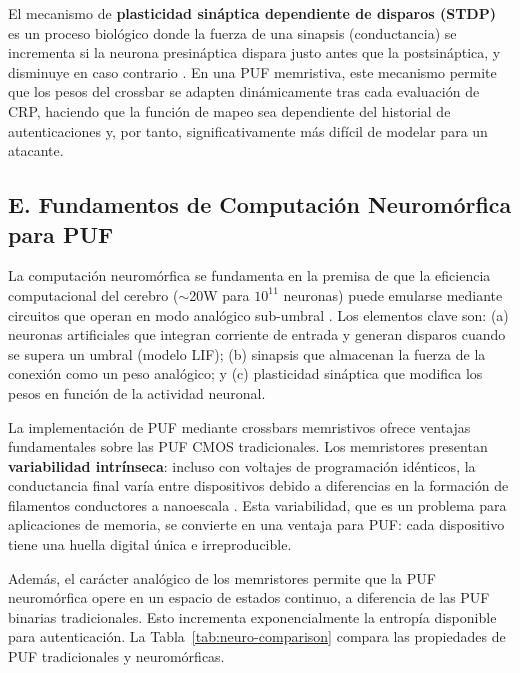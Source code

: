 El mecanismo de \textbf{plasticidad sináptica dependiente de disparos (STDP)} es un proceso biológico donde la fuerza de una sinapsis (conductancia) se incrementa si la neurona presináptica dispara justo antes que la postsináptica, y disminuye en caso contrario \cite{bi1998stdp}. En una PUF memristiva, este mecanismo permite que los pesos del crossbar se adapten dinámicamente tras cada evaluación de CRP, haciendo que la función de mapeo sea dependiente del historial de autenticaciones y, por tanto, significativamente más difícil de modelar para un atacante.

\subsection*{E. Fundamentos de Computación Neuromórfica para PUF}

La computación neuromórfica se fundamenta en la premisa de que la eficiencia computacional del cerebro ($\sim$20W para $10^{11}$ neuronas) puede emularse mediante circuitos que operan en modo analógico sub-umbral \cite{mead1990neuromorphic}. Los elementos clave son: (a) neuronas artificiales que integran corriente de entrada y generan disparos cuando se supera un umbral (modelo LIF); (b) sinapsis que almacenan la fuerza de la conexión como un peso analógico; y (c) plasticidad sináptica que modifica los pesos en función de la actividad neuronal.

La implementación de PUF mediante crossbars memristivos ofrece ventajas fundamentales sobre las PUF CMOS tradicionales. Los memristores presentan \textbf{variabilidad intrínseca}: incluso con voltajes de programación idénticos, la conductancia final varía entre dispositivos debido a diferencias en la formación de filamentos conductores a nanoescala \cite{strukov2008memristor}. Esta variabilidad, que es un problema para aplicaciones de memoria, se convierte en una ventaja para PUF: cada dispositivo tiene una huella digital única e irreproducible.

Además, el carácter analógico de los memristores permite que la PUF neuromórfica opere en un espacio de estados continuo, a diferencia de las PUF binarias tradicionales. Esto incrementa exponencialmente la entropía disponible para autenticación. La Tabla~\ref{tab:neuro-comparison} compara las propiedades de PUF tradicionales y neuromórficas.

